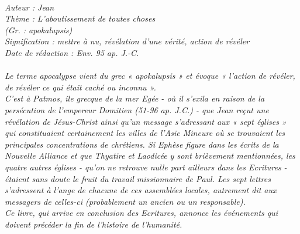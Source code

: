 \BFont
\noindent\hrulefill
{\footnotesize
\textit{
\bigskip
{\centering{}
\\Auteur : Jean
\\Thème : L'aboutissement de toutes choses
\\(Gr. : apokalupsis)
\\Signification : mettre à nu, révélation d'une vérité, action de révéler
\\Date de rédaction : Env. 95 ap. J.-C.\\}
}
\textit{
\\Le terme apocalypse vient du grec « apokalupsis » et évoque « l'action de révéler, de révéler ce qui était caché ou
inconnu ».
\\C'est à Patmos, île grecque de la mer Egée - où il s'exila en raison de la persécution de l'empereur Domitien (51-96 ap. J.C.) - que Jean reçut une révélation de Jésus-Christ ainsi qu'un message s'adressant aux « sept églises » qui constituaient certainement les villes de l'Asie Mineure où se trouvaient les principales concentrations de chrétiens. Si Ephèse figure dans les écrits de la Nouvelle Alliance et que Thyatire et Laodicée y sont brièvement mentionnées, les quatre autres églises - qu'on ne retrouve nulle part ailleurs dans les Ecritures - étaient sans doute le fruit du travail missionnaire de Paul. Les sept lettres s'adressent à l'ange de chacune de ces assemblées locales, autrement dit aux messagers de celles-ci (probablement un ancien ou un responsable).
\\Ce livre, qui arrive en conclusion des Ecritures, annonce les événements qui doivent précéder la fin de l'histoire de l'humanité.\bigskip
}
}
\par\nobreak\noindent\hrulefill
